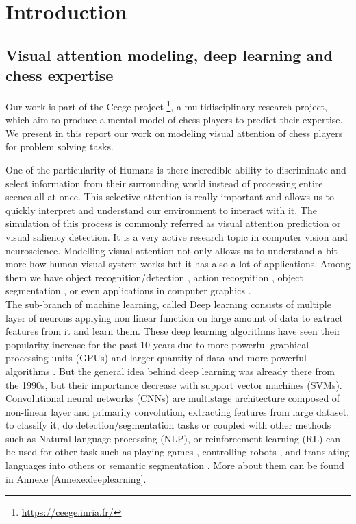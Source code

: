 \chapter{Introduction}

\section{Visual attention modeling, deep learning and chess expertise}

Our work is part of the Ceege project \footnote{\url{https://ceege.inria.fr/}}, a multidisciplinary research project, which aim to produce a mental model of chess players to predict their expertise. We present in this report our work on modeling visual attention of chess players for problem solving tasks.

One of the particularity of Humans is there incredible ability to discriminate and select information from their surrounding world instead of processing entire scenes all at once. This selective attention is  really important and allows us to quickly interpret and understand our environment to interact with it. The simulation of this process is commonly referred as visual attention prediction or visual saliency detection. It is a very active research topic in computer vision and neuroscience. Modelling visual attention not only allows us to understand a bit more how human visual system works but it has also a lot of applications. Among them we have object recognition/detection \cite{saliencydetection,saliencydetectionvideo,Buso2015}, action recognition \cite{DBLP:journals/corr/SafaeiF17,phdthesis}, object segmentation \cite{10.1007/978-3-319-01796-9_31,7984578}, or  even applications in computer graphics \cite{3Dshapevisualattention,phdthesis2}.\\ 

The sub-branch of machine learning, called Deep learning consists of multiple layer of neurons applying non linear function on large amount of data to extract features from it and learn them. These deep learning algorithms have seen their popularity increase for the past 10 years due to more powerful graphical processing units (GPUs) and larger quantity of data \cite{imagenet_cvpr09} and more powerful algorithms \cite{NIPS2012_4824}. But the general idea behind deep learning was already there from the 1990s, but their importance decrease with support vector machines (SVMs). Convolutional neural networks (CNNs) are multistage architecture composed of non-linear layer and primarily convolution, extracting features from large dataset, to classify it, do detection/segmentation tasks  or coupled with other methods such as Natural language processing (NLP), or reinforcement learning (RL) can be used for other task such as playing games \cite{DBLP:journals/corr/MnihKSGAWR13}, controlling robots \cite{DBLP:journals/corr/Amarjyoti17}, and translating languages into others   \cite{DBLP:journals/corr/ChoMGBSB14}or semantic segmentation \cite{shen2014learning}. More about them can be found in Annexe \ref{Annexe:deeplearning}.\\

